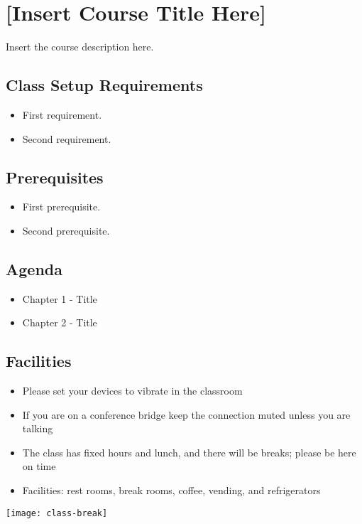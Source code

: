 \documentclass[../workbook]{subfiles}
\begin{document}

\section*{[Insert Course Title Here]}

Insert the course description here.



\subsection*{Class Setup Requirements}

\begin{itemize}
    \item First requirement.
    \item Second requirement.
\end{itemize}



\subsection*{Prerequisites}

\begin{itemize}
    \item First prerequisite.
    \item Second prerequisite.
\end{itemize}



\subsection*{Agenda}

\begin{itemize}
    \item Chapter 1 - Title
    \item Chapter 2 - Title
\end{itemize}



\subsection*{Facilities}

\begin{itemize}
    \item Please set your devices to vibrate in the classroom
    \item If you are on a conference bridge keep the connection muted unless you are talking
    \item The class has fixed hours and lunch, and there will be breaks; please be here on time
    \item Facilities: rest rooms, break rooms, coffee, vending, and refrigerators
\end{itemize}

\edef\measurepage{\the\dimexpr\pagegoal-\pagetotal-\baselineskip\relax}
\mbox{}\hfill\texttt{[image: class-break]}
\end{document}
